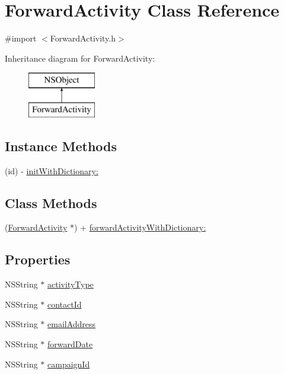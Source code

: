 \hypertarget{interface_forward_activity}{\section{Forward\-Activity Class Reference}
\label{interface_forward_activity}
}


{\ttfamily \#import $<$Forward\-Activity.\-h$>$}

Inheritance diagram for Forward\-Activity\-:\begin{figure}[H]
\begin{center}
\leavevmode
\includegraphics[height=2.000000cm]{interface_forward_activity}
\end{center}
\end{figure}
\subsection*{Instance Methods}
\begin{DoxyCompactItemize}
\item 
(id) -\/ \hyperlink{interface_forward_activity_a7dc56cd9b996d83e7f55d3e26a4f0c9e}{init\-With\-Dictionary\-:}
\end{DoxyCompactItemize}
\subsection*{Class Methods}
\begin{DoxyCompactItemize}
\item 
(\hyperlink{interface_forward_activity}{Forward\-Activity} $\ast$) + \hyperlink{interface_forward_activity_ab776a26160ea0b2ea14d9794b71db9ab}{forward\-Activity\-With\-Dictionary\-:}
\end{DoxyCompactItemize}
\subsection*{Properties}
\begin{DoxyCompactItemize}
\item 
N\-S\-String $\ast$ \hyperlink{interface_forward_activity_a754cd1ea18c02e70e0f8b080fb7911e9}{activity\-Type}
\item 
N\-S\-String $\ast$ \hyperlink{interface_forward_activity_a2a1eeadc413bd97b649b467ab969047e}{contact\-Id}
\item 
N\-S\-String $\ast$ \hyperlink{interface_forward_activity_a304c05fd069d52625f1dafa9cc57a666}{email\-Address}
\item 
N\-S\-String $\ast$ \hyperlink{interface_forward_activity_a3f3583cc908d4fc17e61bb45d1b15299}{forward\-Date}
\item 
N\-S\-String $\ast$ \hyperlink{interface_forward_activity_ae407d3782a7517e8eeba5389ff943f05}{campaign\-Id}
\end{DoxyCompactItemize}



